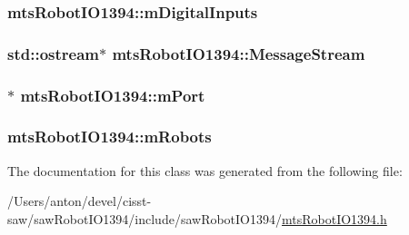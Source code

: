 \subsubsection[{m\+Digital\+Inputs}]{ mts\+Robot\+I\+O1394\+::m\+Digital\+Inputs\hspace{0.3cm}{\ttfamily [protected]}}\label{classmts_robot_i_o1394_ae9b99471cc8a0b6c9b45cb987c1ac37c}
\hypertarget{classmts_robot_i_o1394_a8d67ddd80442e47e158141ab5bcfdf1a}{}
\subsubsection[{Message\+Stream}]{\setlength{\rightskip}{0pt plus 5cm}std\+::ostream$\ast$ mts\+Robot\+I\+O1394\+::\+Message\+Stream\hspace{0.3cm}{\ttfamily [protected]}}\label{classmts_robot_i_o1394_a8d67ddd80442e47e158141ab5bcfdf1a}
\hypertarget{classmts_robot_i_o1394_a9bb22957cd6623ad743e6abf60ea187e}{}
\subsubsection[{m\+Port}]{$\ast$ mts\+Robot\+I\+O1394\+::m\+Port\hspace{0.3cm}{\ttfamily [protected]}}\label{classmts_robot_i_o1394_a9bb22957cd6623ad743e6abf60ea187e}
\hypertarget{classmts_robot_i_o1394_a267e4918bbef8f40fcedffe3a9a6204d}{}
\subsubsection[{m\+Robots}]{ mts\+Robot\+I\+O1394\+::m\+Robots\hspace{0.3cm}{\ttfamily [protected]}}\label{classmts_robot_i_o1394_a267e4918bbef8f40fcedffe3a9a6204d}


The documentation for this class was generated from the following file\+:\begin{DoxyCompactItemize}
\item 
/\+Users/anton/devel/cisst-\/saw/saw\+Robot\+I\+O1394/include/saw\+Robot\+I\+O1394/\hyperlink{mts_robot_i_o1394_8h}{mts\+Robot\+I\+O1394.\+h}\end{DoxyCompactItemize}
